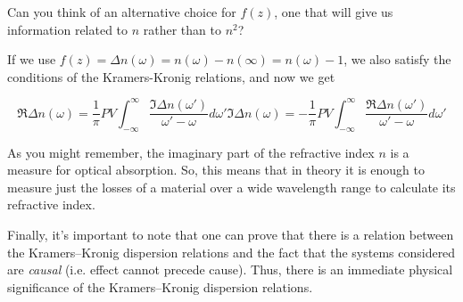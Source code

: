 \begin{cue}
Can you think of an alternative choice for $f(z)$, one that will give us information related to $n$ rather than to $n^2$?
\end{cue}

If we use $f(z)= \Delta n(\omega) = n(\omega) - n(\infty) = n(\omega) - 1$, we also satisfy the conditions of the Kramers-Kronig relations, and now we get

\begin{subequations} 
  \begin{equation}
  \Re \Delta n(\omega) = \frac{1}{\pi} PV \int_{- \infty}^{\infty} \frac{\Im
  \Delta n(\omega')}{\omega'-\omega}d\omega'
  \end{equation} 
  \begin{equation}
  \Im \Delta n(\omega) = -\frac{1}{\pi} PV \int_{- \infty}^{\infty} \frac{\Re
  \Delta n (\omega')}{\omega'-\omega}d\omega'
  \end{equation}
  \label{eq-KK-3}
  \end{subequations}

As you might remember, the imaginary part of the refractive index $n$ is a measure for optical absorption. So, this means that in theory it is enough to measure just the losses of a material over a wide wavelength range to calculate its refractive index.

Finally, it's important to note that one can prove that there is a relation between the Kramers--Kronig dispersion relations and the fact that the systems considered are \emph{causal} (i.e. effect cannot precede cause)\noindent{}. Thus, there is an immediate physical significance of the Kramers--Kronig dispersion relations.

